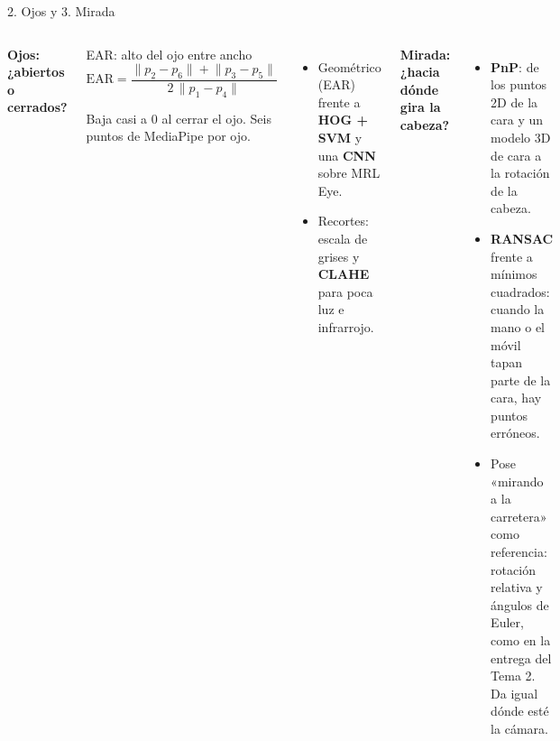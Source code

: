 \documentclass[aspectratio=169,9pt,t,xcolor={table}]{beamer}
\begin{document}
\begin{frame}{2. Ojos y 3. Mirada}
\vspace{1mm}
\begin{columns}[T,onlytextwidth]
\textbf{Ojos: ¿abiertos o cerrados?}
\vspace{1.5mm}
\begin{caja}{EAR: alto del ojo entre ancho}
\centering
$\mathrm{EAR} = \dfrac{\lVert p_2-p_6\rVert + \lVert p_3-p_5\rVert}{2\,\lVert p_1-p_4\rVert}$

\vspace{1mm}
\raggedright\scriptsize Baja casi a 0 al cerrar el ojo. Seis puntos de MediaPipe por ojo.
\end{caja}
\vspace{1.5mm}
\begin{itemize}\setlength{\itemsep}{1mm}\small
  \item Geométrico (EAR) frente a \textbf{HOG + SVM} y una \textbf{CNN} sobre MRL Eye.
  \item Recortes: escala de grises y \textbf{CLAHE} para poca luz e infrarrojo.
\end{itemize}
\textbf{Mirada: ¿hacia dónde gira la cabeza?}
\vspace{1.5mm}
\begin{itemize}\setlength{\itemsep}{1.4mm}\small
  \item \textbf{PnP}: de los puntos 2D de la cara y un modelo 3D de cara a la rotación de la cabeza.
  \item \textbf{RANSAC} frente a mínimos cuadrados: cuando la mano o el móvil tapan parte de la
        cara, hay puntos erróneos.
  \item Pose «mirando a la carretera» como referencia: rotación relativa y ángulos de Euler, como en
        la entrega del Tema 2. Da igual dónde esté la cámara.
\end{itemize}
\end{columns}
\end{frame}
\end{document}
